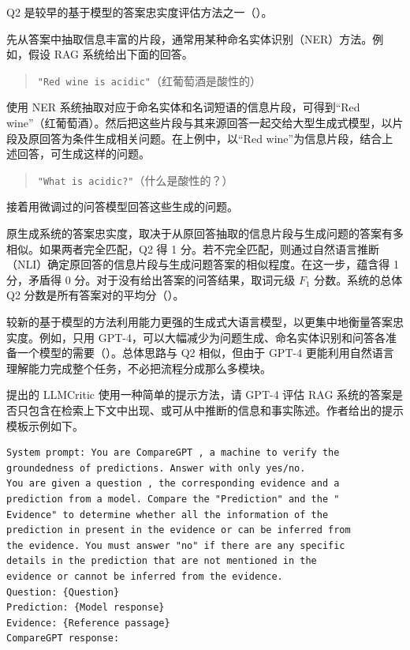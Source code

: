 Q2 是较早的基于模型的答案忠实度评估方法之一（）。

\begin{keypoint}
先从答案中抽取信息丰富的片段，通常用某种命名实体识别（NER）方法。例如，假设 RAG 系统给出下面的回答。
\begin{quote}
\texttt{"Red wine is acidic"}（红葡萄酒是酸性的）
\end{quote}
使用 NER 系统抽取对应于命名实体和名词短语的信息片段，可得到“Red wine”（红葡萄酒）。然后把这些片段与其来源回答一起交给大型生成式模型，以片段及原回答为条件生成相关问题。在上例中，以“Red wine”为信息片段，结合上述回答，可生成这样的问题。
\begin{quote}
\texttt{"What is acidic?"}（什么是酸性的？）
\end{quote}
接着用微调过的问答模型回答这些生成的问题。
\end{keypoint}

原生成系统的答案忠实度，取决于从原回答抽取的信息片段与生成问题的答案有多相似。如果两者完全匹配，Q2 得 1 分。若不完全匹配，则通过自然语言推断（NLI）确定原回答的信息片段与生成问题答案的相似程度。在这一步，蕴含得 1 分，矛盾得 0 分。对于没有给出答案的问答结果，取词元级 $F_1$ 分数。系统的总体 Q2 分数是所有答案对的平均分（）。

较新的基于模型的方法利用能力更强的生成式大语言模型，以更集中地衡量答案忠实度。例如，只用 GPT-4，可以大幅减少为问题生成、命名实体识别和问答各准备一个模型的需要（）。总体思路与 Q2 相似，但由于 GPT-4 更能利用自然语言理解能力完成整个任务，不必把流程分成那么多模块。

提出的 LLMCritic 使用一种简单的提示方法，请 GPT-4 评估 RAG 系统的答案是否只包含在检索上下文中出现、或可从中推断的信息和事实陈述。作者给出的提示模板示例如下。

\begin{lstlisting}[caption={评估答案忠实度的提示示例},label={lst:ch07-comparegpt}]
System prompt: You are CompareGPT , a machine to verify the
groundedness of predictions. Answer with only yes/no.
You are given a question , the corresponding evidence and a
prediction from a model. Compare the "Prediction" and the "
Evidence" to determine whether all the information of the
prediction in present in the evidence or can be inferred from
the evidence. You must answer "no" if there are any specific
details in the prediction that are not mentioned in the
evidence or cannot be inferred from the evidence.
Question: {Question}
Prediction: {Model response}
Evidence: {Reference passage}
CompareGPT response:
\end{lstlisting}

